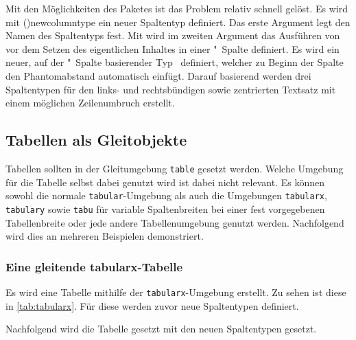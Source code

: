 \documentclass[%
  english,ngerman,%
  cdgeometry=no,DIV=12,%
  cd=false,cdfont=false,cdtitle=true,%
  headings=normal,%
  automark,%
  listof=toc,%
]{tudscrartcl}
\begin{document}
Mit den Möglichkeiten des Paketes  ist das Problem relativ 
schnell gelöst. Es wird mit \Macro(){newcolumntype} ein neuer 
Spaltentyp definiert. Das erste Argument legt den Namen des Spaltentyps fest. 
Mit  wird im zweiten Argument 
das Ausführen von  vor dem Setzen des eigentlichen Inhaltes 
in einer "~Spalte definiert. Es wird ein neuer, auf der 
"~Spalte basierender Typ~ definiert, welcher zu Beginn der 
Spalte den Phantomabstand automatisch einfügt. Darauf basierend werden drei 
Spaltentypen für den links- und rechtsbündigen sowie zentrierten Textsatz mit 
einem möglichen Zeilenumbruch erstellt.
%
\begin{Trunk+}
\subsection{Tabellen als Gleitobjekte}

Tabellen sollten in der Gleitumgebung \texttt{table} gesetzt werden. 
Welche Umgebung für die Tabelle selbst dabei genutzt wird ist dabei
nicht relevant. Es können sowohl die normale \texttt{tabular}-Umgebung 
als auch die Umgebungen \texttt{tabularx}, \texttt{tabulary} sowie 
\texttt{tabu} für variable Spaltenbreiten bei einer fest vorgegebenen 
Tabellenbreite oder jede andere Tabellenumgebung genutzt werden. 
Nachfolgend wird dies an mehreren Beispielen demonstriert.

\subsubsection{Eine gleitende tabularx-Tabelle}

Es wird eine Tabelle mithilfe der \texttt{tabularx}-Umgebung erstellt. 
Zu sehen ist diese in \autoref{tab:tabularx}. Für diese werden zuvor 
neue Spaltentypen definiert.

\end{Trunk+}
\CodeHook{\renewcommand*{\newcolumntype}[2]{}}
\begin{Trunk*}

\end{Trunk*}
%
Nachfolgend wird die Tabelle gesetzt mit den neuen Spaltentypen gesetzt.
%
\end{document}
